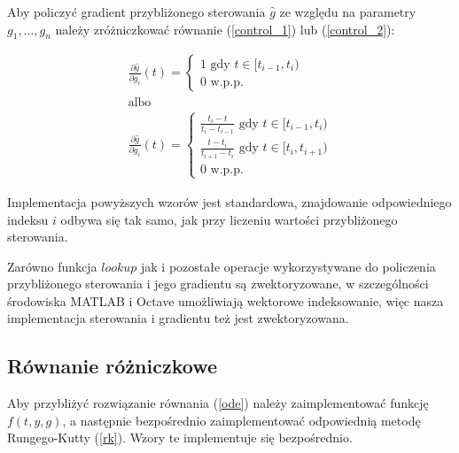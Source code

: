 \documentclass[11pt]{article}
\begin{document}
Aby policzyć gradient przybliżonego sterowania $\hat{g}$ ze względu na parametry $g_1,\ldots,g_n$ należy zróżniczkować równanie (\ref{control_1}) lub (\ref{control_2}):

\begin{gather}
  \frac{\partial \hat{g}}{\partial g_i}(t) = \begin{cases} 1 \text{ gdy } t \in [t_{i-1}, t_i) \\ 0 \text{ w.p.p.} \end{cases} \label{dcontrol_1}\\
  \nonumber \text{albo}\\
  \frac{\partial \hat{g}}{\partial g_i}(t) = \begin{cases} \frac{t_i - t}{t_i - t_{i-1}} \text{ gdy } t \in [t_{i-1}, t_i) \\ \frac{t - t_i}{t_{i+1} - t_i} \text{ gdy } t \in [t_{i}, t_{i+1}) \\ 0 \text{ w.p.p.} \end{cases} \label{dcontrol_2}
\end{gather}

Implementacja powyższych wzorów jest standardowa, znajdowanie odpowiedniego indeksu $i$ odbywa się tak samo, jak przy liczeniu wartości przybliżonego sterowania.

Zarówno funkcja $lookup$ jak i pozostałe operacje wykorzystywane do policzenia przybliżonego sterowania i jego gradientu są zwektoryzowane, w szczególności środowiska MATLAB i Octave umożliwiają wektorowe indeksowanie, więc nasza implementacja sterowania i gradientu też jest zwektoryzowana.

\subsection{Równanie różniczkowe}\label{subsec_rrz}
Aby przybliżyć rozwiązanie równania (\ref{ode}) należy zaimplementować funkcję $f(t,y,g)$, a następnie bezpośrednio zaimplementować odpowiednią metodę Rungego-Kutty (\ref{rk}). Wzory te implementuje się bezpośrednio.
\end{document}
